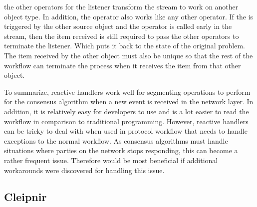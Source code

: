 the other operators for the listener transform the stream to work on another object type. In addition, the  operator also works like any other operator. If the  is triggered by the other source object and the operator is called early in the stream, then the item received is still required to pass the other operators to terminate the listener. Which puts it back to the state of the original problem. The item received by the other  object must also be unique so that the rest of the workflow can terminate the process when it receives the item from that other  object.

To summarize, reactive handlers work well for segmenting operations to perform for the consensus algorithm when a new event is received in the network layer. In addition, it is relatively easy for developers to use and is a lot easier to read the workflow in comparison to traditional programming. However, reactive handlers can be tricky to deal with when used in protocol workflow that needs to handle exceptions to the normal workflow. As consensus algorithms must handle situations where parties on the network stops responding, this can become a rather frequent issue. Therefore would be most beneficial if additional workarounds were discovered for handling this issue.  

\subsection{Cleipnir}

